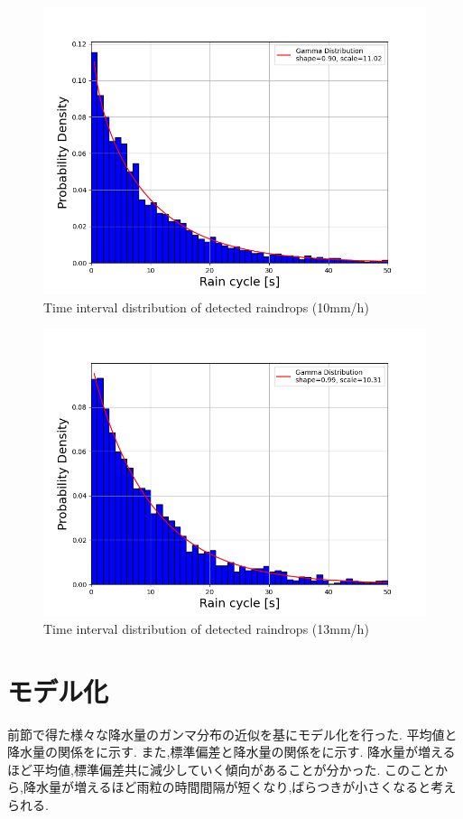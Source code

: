 \begin{figure}[H]
    \centering
    \includegraphics[keepaspectratio, scale=0.5]{images/png/10mm.png}
    \caption{Time interval distribution of detected raindrops (10mm/h)}
    \label{Fig:5.5}
\end{figure}

\begin{figure}[H]
    \centering
    \includegraphics[keepaspectratio, scale=0.5]{images/png/13mm.png}
    \caption{Time interval distribution of detected raindrops (13mm/h)}
    \label{Fig:5.6}
\end{figure}

\section{モデル化}
前節で得た様々な降水量のガンマ分布の近似を基にモデル化を行った.
平均値と降水量の関係をに示す.
また,標準偏差と降水量の関係をに示す.
降水量が増えるほど平均値,標準偏差共に減少していく傾向があることが分かった.
このことから,降水量が増えるほど雨粒の時間間隔が短くなり,ばらつきが小さくなると考えられる.


